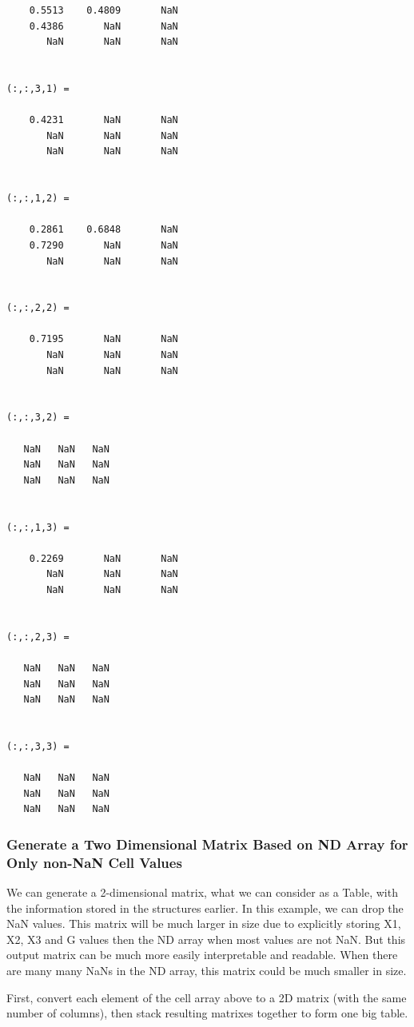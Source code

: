 \documentclass[
]{book}
\begin{document}
\begin{verbatim}
    0.5513    0.4809       NaN
    0.4386       NaN       NaN
       NaN       NaN       NaN


(:,:,3,1) =

    0.4231       NaN       NaN
       NaN       NaN       NaN
       NaN       NaN       NaN


(:,:,1,2) =

    0.2861    0.6848       NaN
    0.7290       NaN       NaN
       NaN       NaN       NaN


(:,:,2,2) =

    0.7195       NaN       NaN
       NaN       NaN       NaN
       NaN       NaN       NaN


(:,:,3,2) =

   NaN   NaN   NaN
   NaN   NaN   NaN
   NaN   NaN   NaN


(:,:,1,3) =

    0.2269       NaN       NaN
       NaN       NaN       NaN
       NaN       NaN       NaN


(:,:,2,3) =

   NaN   NaN   NaN
   NaN   NaN   NaN
   NaN   NaN   NaN


(:,:,3,3) =

   NaN   NaN   NaN
   NaN   NaN   NaN
   NaN   NaN   NaN
\end{verbatim}

\hypertarget{generate-a-two-dimensional-matrix-based-on-nd-array-for-only-non-nan-cell-values}{%
\subsubsection{Generate a Two Dimensional Matrix Based on ND Array for Only non-NaN Cell Values}\label{generate-a-two-dimensional-matrix-based-on-nd-array-for-only-non-nan-cell-values}}

We can generate a 2-dimensional matrix, what we can consider as a Table,
with the information stored in the structures earlier. In this example,
we can drop the NaN values. This matrix will be much larger in size due
to explicitly storing X1, X2, X3 and G values then the ND array when
most values are not NaN. But this output matrix can be much more easily
interpretable and readable. When there are many many NaNs in the ND
array, this matrix could be much smaller in size.

First, convert each element of the cell array above to a 2D matrix (with
the same number of columns), then stack resulting matrixes together to
form one big table.
\end{document}
